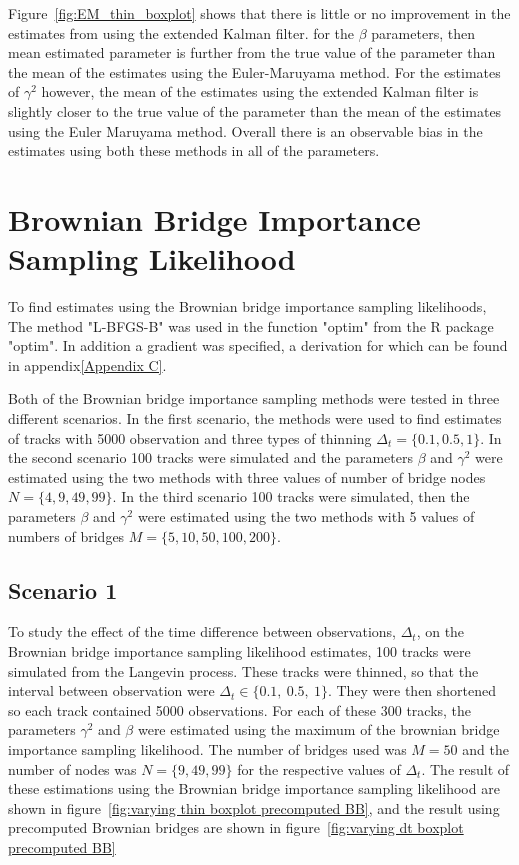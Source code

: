 Figure~\ref{fig:EM_thin_boxplot} shows that there is little or no improvement in the estimates from using the extended Kalman filter. for the $\beta$ parameters, then mean estimated parameter is further from the true value of the parameter than the mean of the estimates using the Euler-Maruyama method. For the estimates of $\gamma^2$ however, the mean of the estimates using the extended Kalman filter is slightly closer to the true value of the parameter than the mean of the estimates using the Euler Maruyama method. Overall there is an observable bias in the estimates using both these methods in all of the parameters.

\section{Brownian Bridge Importance Sampling Likelihood}
\label{sec: BB test}
To find estimates using the Brownian bridge importance sampling likelihoods, The method "L-BFGS-B" was used in the function "optim" from the R package "optim". In addition a gradient was specified, a derivation for which can be found in appendix\ref{Appendix C}. 


Both of the Brownian bridge importance sampling methods were tested in three different scenarios. In the first scenario, the methods were used to find estimates of tracks with 5000 observation and three types of thinning $\Delta_t =\{0.1, 0.5, 1\}$. In the second scenario 100 tracks were simulated and the parameters $\beta$ and $\gamma^2$ were estimated using the two methods with three values of number of bridge nodes $N=\{4, 9, 49, 99\}$. In the third scenario 100 tracks were simulated, then the parameters $\beta$ and $\gamma^2$ were estimated using the two methods with 5 values of numbers of bridges $M=\{5,10,50,100,200\}$. 


\subsection{Scenario 1}
To study the effect of the time difference between observations, $\Delta_t$, on the Brownian bridge importance sampling likelihood estimates, 100 tracks were simulated from the Langevin process. These tracks were thinned, so that the interval between observation were $\Delta_t \in \{0.1, \ 0.5, \ 1\}$. They were then shortened so each track contained 5000 observations. For each of these 300 tracks, the parameters $\gamma^2$ and $\beta$ were estimated using the maximum of the brownian bridge importance sampling likelihood. The number of bridges used was $M=50$ and the number of nodes was $N =\{9,49,99\}$ for the respective values of $\Delta_t$. The result of these estimations using the Brownian bridge importance sampling likelihood are shown in figure~\ref{fig:varying thin boxplot precomputed BB}, and the result using precomputed Brownian bridges are shown in figure~\ref{fig:varying dt boxplot precomputed BB}

